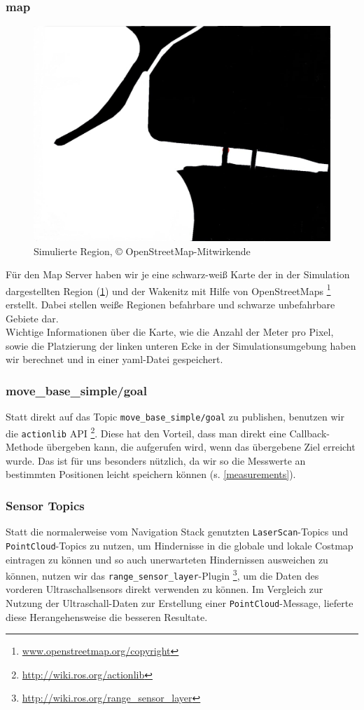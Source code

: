 \documentclass[11pt]{article}
\begin{document}
\subsubsection{map}

\begin{figure}
    \centering
	\includegraphics[width=0.7\linewidth]{diluvio.jpg}
	\caption{Simulierte Region, © OpenStreetMap-Mitwirkende}
	\label{diluvio}
\end{figure}

Für den Map Server haben wir je eine schwarz-weiß Karte der in der Simulation dargestellten Region (\ref{diluvio}) und der Wakenitz mit Hilfe von OpenStreetMaps \footnote{\url{www.openstreetmap.org/copyright}} erstellt. Dabei stellen weiße Regionen befahrbare und schwarze unbefahrbare Gebiete dar.\\
Wichtige Informationen über die Karte, wie die Anzahl der Meter pro Pixel, sowie die Platzierung der linken unteren Ecke in der Simulationsumgebung haben wir berechnet und in einer yaml-Datei gespeichert.

\subsubsection{move\_base\_simple/goal} \label{goal}
Statt direkt auf das Topic \texttt{move\_base\_simple/goal} zu publishen, benutzen wir die \texttt{actionlib} API \footnote{\url{http://wiki.ros.org/actionlib}}. Diese hat den Vorteil, dass man direkt eine Callback-Methode übergeben kann, die aufgerufen wird, wenn das übergebene Ziel erreicht wurde. Das ist für uns besonders nützlich, da wir so die Messwerte an bestimmten Positionen leicht speichern können (s. \ref{measurements}).

\subsubsection{Sensor Topics}
Statt die normalerweise vom Navigation Stack genutzten \texttt{LaserScan}-Topics und \texttt{PointCloud}-Topics zu nutzen, um Hindernisse in die globale und lokale Costmap eintragen zu können und so auch unerwarteten Hindernissen ausweichen zu können, nutzen wir das \texttt{range\_sensor\_layer}-Plugin \footnote{\url{http://wiki.ros.org/range_sensor_layer}}, um die Daten des vorderen Ultraschallsensors direkt verwenden zu können. Im Vergleich zur Nutzung der Ultraschall-Daten zur Erstellung einer \texttt{PointCloud}-Message, lieferte diese Herangehensweise die besseren Resultate.
\end{document}
